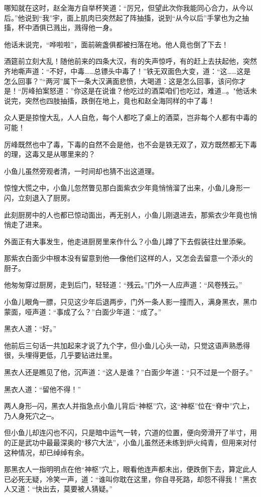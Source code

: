 \documentclass[12pt,oneside]{book}
\begin{document}
哪知就在这时，赵全海方自举杯笑道：``厉兄，但望此次你我能同心合力，从今以后。''他说到``我''宇，面上肌肉已突然起了阵抽搐，说到``从今以后''手掌也为之抽搐，杯中酒俱已溅出，溅得他一身。

他话未说完，``哗啦啦''，面前碗盏俱都被扫落在地。他人竟也倒了下去！

酒筵前立刻大乱！随他前来的四条大汉，有的失声惊呼，有的赶上去扶起他，突然齐地嘶声道：``不好，中毒\ldots\ldots 总镖头中毒了！''铁无双面色大变，道：``这\ldots\ldots 这是怎么回事？''``两河''属下一条大汉满面悲愤，大喝道：这是怎么回事，该问你才是！``厉峰拍案怒道：''你这是在说谁？他吃过的酒菜咱们也吃过，难道\ldots。"他话未说完，突然也四肢抽搐，跌倒在地上，竟也和赵全海同样的中了毒！

众人更是掠惶大乱，人人自危，每个人都吃了桌上的酒菜，岂非每个人都有中毒的可能！

厉峰既然也中了毒，下毒的自然不会是他，也不会是铁无双了，双方既然都无下毒的理，这毒又是从哪里来的？

小鱼儿虽然旁观者清，一时间却也猜不出这道理。

惊惶大慌之中，小鱼儿忽然瞥见那白面紫衣少年竟悄悄溜了出来，小鱼儿身形一闪，立刻退入了厨房。

此刻厨房中的人也都已惊动面出，再无别人，小鱼儿刚退进去，那紫衣少年竟也悄悄走了进来。

外面正有大事发生，他走进厨房里来作什么？小鱼儿蹲了下去假装往灶里添柴。

那紫衣白面少中根本没有留意到他──像他们这样的人，又怎会去留意一个添火的厨子。

他匆匆穿过厨房，走到后门，轻轻道：``残云。''门外一人应声道：``风卷残云。''

小鱼儿眼角一膘，只见这少年后退两步，门外一条人影一撞而入，满身黑衣，黑巾蒙面，哑声道：``事成了么？''白面少年道：``成了。''

黑衣人道：``好。''

他前后三句话一共加起来才说了九个字，但小鱼儿心头一动，只觉这语声熟悉得很，头埋得更低，几乎要钻进灶里。

黑衣人还是瞧见了他，沉声道：``这人是谁？''白面少年道：``只不过是一个厨子。''

黑衣人道：``留他不得！''

两人身形─闪，黑衣人并指急点小鱼儿背后``神枢''穴，这``神枢''位在``脊中''穴上，乃人身死穴之─。

但小鱼儿却连闪也不闪，只是暗中运气一转，穴道的位置，便向旁滑开了半寸，用的正是武功中最最深奥的``移穴大法''，小鱼儿虽然还未练到炉火纯青，但用来对付这种情况，却已绰绰有余。

那黑衣人一指明明点在他``神枢''穴上，眼看他连声都未出，便跌倒下去，算定此人已必死无疑，冷笑一声，道：``谁叫你耽在这里，你自寻死路，却怨不得我！''黑衣人又道：``快出去，莫要被人猜疑。''
\end{document}
